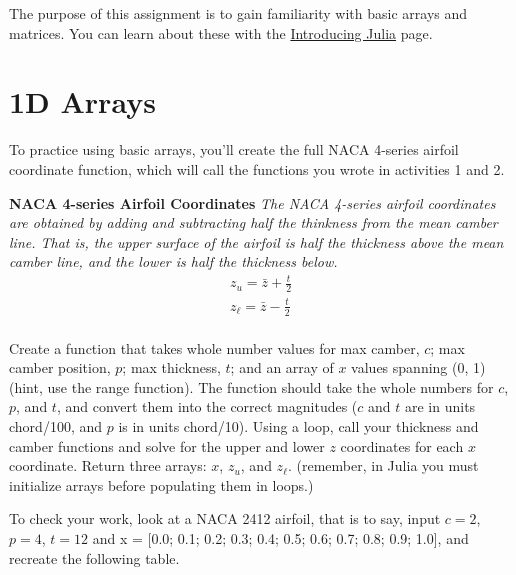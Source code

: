 \documentclass{article}%
\begin{document}
The purpose of this assignment is to gain familiarity with basic arrays and matrices. You can learn about these with the \href{https://en.wikibooks.org/wiki/Introducing_Julia/Arrays_and_tuples}{Introducing Julia} page.

\section{1D Arrays}
To practice using basic arrays, you'll create the full NACA 4-series airfoil coordinate function, which will call the functions you wrote in activities 1 and 2.

\bigskip

\begin{tcolorbox}
	\textbf{
		NACA 4-series Airfoil Coordinates}
	\textit{
		The NACA 4-series airfoil coordinates are obtained by adding and subtracting half the thinkness from the mean camber line. That is, the upper surface of the airfoil is half the thickness above the mean camber line, and the lower is half the thickness below.
	}
	\begin{align*}
	z_u = \bar{z} + \frac{t}{2}\\
	z_\ell = \bar{z} - \frac{t}{2}\\
	\end{align*}
	
\end{tcolorbox}

\bigskip

Create a function that takes whole number values for max camber, $c$; max camber position, $p$; max thickness, $t$; and an array of $x$ values spanning (0, 1) (hint, use the range function). The function should take the whole numbers for $c$, $p$, and $t$, and convert them into the correct magnitudes ($c$ and $t$ are in units chord/100, and $p$ is in units chord/10). Using a loop, call your thickness and camber functions and solve for the upper and lower $z$ coordinates for each $x$ coordinate. Return three arrays: $x$, $z_u$, and $z_\ell$. (remember, in Julia you must initialize arrays before populating them in loops.)

To check your work, look at a NACA 2412 airfoil, that is to say, input $c=2$, $p=4$, $t=12$ and x = [0.0; 0.1; 0.2; 0.3; 0.4; 0.5; 0.6; 0.7; 0.8; 0.9; 1.0], and recreate the following table.

\bigskip
\end{document}
